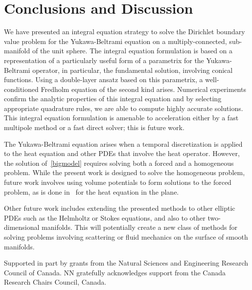\section{Conclusions and Discussion}
We have presented an integral equation strategy to solve the Dirichlet
boundary value problem for the Yukawa-Beltrami equation on a
multiply-connected, sub-manifold of the unit sphere.  The integral
equation formulation is based on a representation of a particularly
useful form of a parametrix for the Yukawa-Beltrami operator, in
particular, the fundamental solution, involving conical functions.
Using a double-layer ansatz based on this parametrix, a well-conditioned
Fredholm equation of the second kind arises.  Numerical experiments
confirm the analytic properties of this integral equation and by
selecting appropriate quadrature rules, we are able to compute highly
accurate solutions.  This integral equation formulation is amenable to
acceleration either by a fast multipole method or a fast direct solver;
this is future work.  

The Yukawa-Beltrami equation arises when a temporal discretization is
applied to the heat equation and other PDEs that involve the heat
operator.  However, the solution of~\eqref{bigmodel} requires solving
both a forced and a homogeneous problem.  While the present work is
designed to solve the homogeneous problem, future work involves using
volume potentials to form solutions to the forced problem, as is done
in~\cite{rothe:heat} for the heat equation in the plane.

Other future work includes extending the presented methods to other
elliptic PDEs such as the Helmholtz or Stokes equations, and also to
other two-dimensional manifolds.  This will potentially create a new
class of methods for solving problems involving scattering or fluid
mechanics on the surface of smooth manifolds.

\begin{acknowledgements}
Supported in part by grants from the Natural Sciences and Engineering
Research Council of Canada. NN gratefully acknowledges support from the
Canada Research Chairs Council, Canada.
\end{acknowledgements}


%

